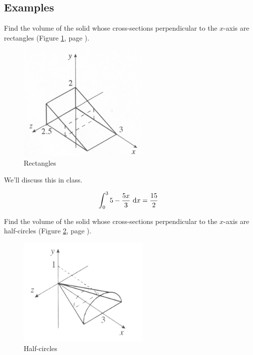 \documentclass[12pt,addpoints, answers, fleqn]{exam}
\begin{document}
\subsection{Examples}
\begin{questions}
\question Find the volume of the solid whose cross-sections perpendicular to the $x$-axis are rectangles (Figure \ref{fig:graph3102}, page \pageref{fig:graph3102}).
\begin{figure}[htbp] %
   \centering
   \includegraphics[width=2.5in]{./graphics/graph3102.pdf} 
   \caption{Rectangles}
   \label{fig:graph3102}
\end{figure}

\begin{solution}
We'll discuss this in class.

\[
\int_0^3 5 - \frac{5x}{3} \ {\rm{d}} x = \frac{15}{2}
\]
\end{solution}


\question Find the volume of the solid whose cross-sections perpendicular to the $x$-axis are half-circles (Figure \ref{fig:graph3104}, page \pageref{fig:graph3104}).
\begin{figure}[htbp] %
   \centering
   \includegraphics[width=2.5in]{./graphics/graph3104.pdf} 
   \caption{Half-circles}
   \label{fig:graph3104}
\end{figure}


\end{questions}
\end{document}
